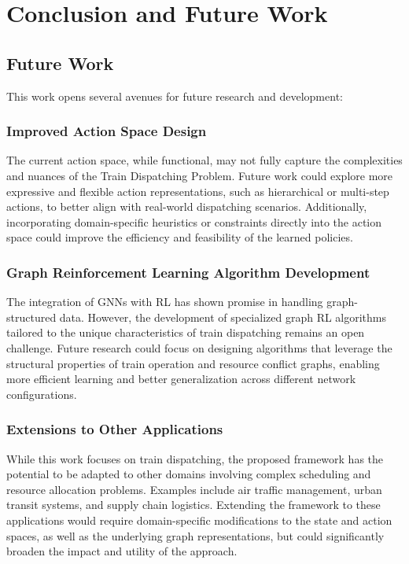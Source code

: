\documentclass[runningheads]{llncs}
\begin{document}
\section{Conclusion and Future Work}
\label{sse:conclusion}

\subsection{Future Work}
\label{sss:future_work}
This work opens several avenues for future research and development:

\subsubsection{Improved Action Space Design}
The current action space, while functional, may not fully capture the complexities and nuances of the Train Dispatching Problem. 
Future work could explore more expressive and flexible action representations, such as hierarchical or multi-step actions, to better align with real-world dispatching scenarios. 
Additionally, incorporating domain-specific heuristics or constraints directly into the action space could improve the efficiency and feasibility of the learned policies.

\subsubsection{Graph Reinforcement Learning Algorithm Development}
The integration of GNNs with RL has shown promise in handling graph-structured data. 
However, the development of specialized graph RL algorithms tailored to the unique characteristics of train dispatching remains an open challenge. 
Future research could focus on designing algorithms that leverage the structural properties of train operation and resource conflict graphs, enabling more efficient learning and better generalization across different network configurations.

\subsubsection{Extensions to Other Applications}
While this work focuses on train dispatching, the proposed framework has the potential to be adapted to other domains involving complex scheduling and resource allocation problems. 
Examples include air traffic management, urban transit systems, and supply chain logistics. 
Extending the framework to these applications would require domain-specific modifications to the state and action spaces, as well as the underlying graph representations, but could significantly broaden the impact and utility of the approach.
\end{document}
